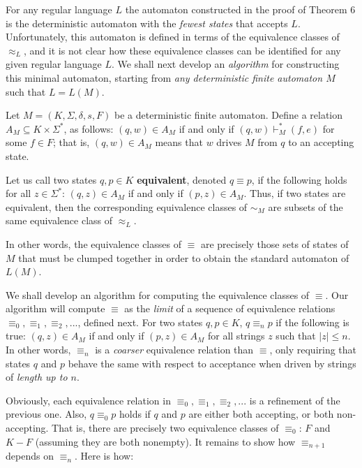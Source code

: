 \begin{multicols}{2}
\setlength{\columnsep}{1.5cm}
\setlength{\columnseprule}{0.2pt}
  For any regular language $L$ the automaton constructed in the proof of Theorem 6 is the deterministic automaton with the \textit{fewest states} that accepts $L$. Unfortunately, this automaton is defined in terms of the equivalence classes of $\approx_L$, and it is not clear how these equivalence classes can be identified for any given regular language $L$. We shall next develop an \textit{algorithm} for constructing this minimal automaton, starting from \textit{any deterministic finite automaton $M$} such that $L = L(M)$.
  
  Let $M = (K, \Sigma, \delta, s, F)$ be a deterministic finite automaton. Define a relation $A_M \subseteq K \times \Sigma^*$, as follows: $(q, w) \in A_M$ if and only if $(q, w) \vdash_M^* (f, e)$ for some $f \in F$; that is, $(q, w) \in A_M$ means that $w$ drives $M$ from $q$ to an accepting state. 
  
  Let us call two states $q, p \in K$ \textbf{equivalent}, denoted $q \equiv p$, if the following holds for all $z \in \Sigma^*$: $(q, z) \in A_M$ if and only if $(p, z) \in A_M$. Thus, if two states are equivalent, then the corresponding equivalence classes of $\sim_M$ are subsets of the same equivalence class of $\approx_L$.
  
  In other words, the equivalence classes of $\equiv$ are precisely those sets of states of $M$ that must be clumped together in order to obtain the standard automaton of $L(M)$.
  
  We shall develop an algorithm for computing the equivalence classes of $\equiv$. Our algorithm will compute $\equiv$ as the \textit{limit} of a sequence of equivalence relations $\equiv_0, \equiv_1, \equiv_2, ...$, defined next. For two states $q, p \in K$, $q \equiv_n p$ if the following is true: $(q, z) \in A_M$ if and only if $(p, z) \in A_M$ for all strings $z$ such that $|z| \leq n$. In other words, $\equiv_n$ is a \textit{coarser} equivalence relation than $\equiv$, only requiring that states $q$ and $p$ behave the same with respect to acceptance when driven by strings of \textit{length up to $n$}.

  Obviously, each equivalence relation in $\equiv_0, \equiv_1, \equiv_2, ...$ is a refinement of the previous one. Also, $q \equiv_0 p$ holds if $q$ and $p$ are either both accepting, or both non-accepting. That is, there are precisely two equivalence classes of $\equiv_0$: $F$ and $K - F$ (assuming they are both nonempty). It remains to show how $\equiv_{n+1}$ depends on $\equiv_n$. Here is how:
\end{multicols}

